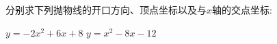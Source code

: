 \documentclass[10pt]{article}
\begin{document}
\begin{questions}{\answeringintroduction}
    \question 分别求下列抛物线的开口方向、顶点坐标以及与$x$轴的交点坐标:
    \begin{subquestions}
        \subquestion $y=-2x^2+6x+8$
        \subquestion $y=x^2-8x-12$
    \end{subquestions}
    \question %
    \begin{subquestions}
        \subquestion %
        \subquestion %
    \end{subquestions}
    \question %
    \begin{subquestions}
        \subquestion %
        \subquestion %
    \end{subquestions}
    \question
    \begin{subquestions}
        \subquestion %
        \subquestion %
    \end{subquestions}
    \question %
    \begin{subquestions}
        \subquestion %
        \subquestion %
    \end{subquestions}
    \question %
    \begin{subquestions}
        \subquestion %
        \subquestion %
        \subquestion %
    \end{subquestions}
    \question %
    \begin{subquestions}
        \subquestion %
        \subquestion %
        \subquestion %
    \end{subquestions}
    \question %
    \begin{subquestions}
        \subquestion %
        \subquestion %
        \subquestion %
    \end{subquestions}
\end{questions}
\end{document}
